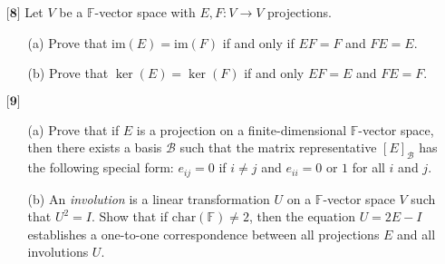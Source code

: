 \documentclass[12pt]{article}
\DeclarePairedDelimiter\set\{\}
\begin{document}
\begin{itemize}
    \begin{proof}
        Let the vector space $Z$ represent the subspace spanned by $U+W$.
        \[Z = \text{span}(\set{U+W})\]
        Meaning any vector $z\in Z$ is of the form $z = u + w$ where $u$ and $w$ are vectors of $U$ and $W$ respectively. This gives us,
        \begin{align*}
            T(z) = T(u + w) = T(u) + T(w) \subseteq U + W
        \end{align*}
    \end{proof}
    
    \vspace{.5cm}
    \item[$\textbf{[8]}$]
    Let $V$ be a $\mathbb{F}$-vector space with $E,F: V \rightarrow V$ projections. 
    \begin{itemize}

    \vspace{.3cm}
    \item[(a)]
    Prove that $\text{im}(E) = \text{im}(F)$ if and only if $EF = F$ and $FE = E$.
    
    \vspace{.3cm}
    \item[(b)]
    Prove that $\ker(E) = \ker(F)$ if and only $EF = E$ and $FE = F$.
    
    \end{itemize}
    
    \vspace{.5cm}
    \item[$\textbf{[9]}$]
    \begin{itemize}
    
    \item[(a)]
    Prove that if $E$ is a projection on a finite-dimensional $\mathbb{F}$-vector space, then there exists a basis $\mathcal{B}$ such that the matrix representative $[E]_\mathcal{B}$ has the following special form: $e_{ij} = 0$ if $i \neq j$ and $e_{ii} = 0$ or $1$ for all $i$ and $j$. 
    
    \vspace{.3cm}
    \item[(b)]
    An \textit{involution} is a linear transformation $U$ on a $\mathbb{F}$-vector space $V$ such that $U^2 = I$. Show that if $\text{char}(\mathbb{F}) \neq 2$, then the equation $U = 2E - I$ establishes a one-to-one correspondence between all projections $E$ and all involutions $U$.
    

\end{itemize}
\end{itemize}
\end{document}
